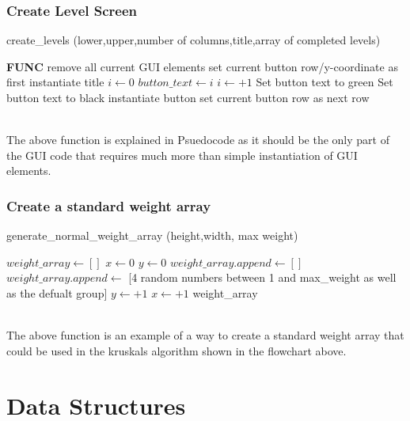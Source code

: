 \documentclass{article}
\begin{document}
\subsubsection{Create Level Screen}
\begin{algorithm}
\caption{create\_levels (lower,upper,number of columns,title,array of completed levels)}
\begin{algorithmic} 
\STATE \textbf{FUNC} remove all current GUI elements
\STATE set current button row/y-coordinate as first
\STATE instantiate title
\STATE $i \leftarrow 0$
\STATE$ button\_text \leftarrow i$
\STATE $i \leftarrow +1$
\STATE Set button text to green
\ELSE
\STATE Set button text to black
\ENDIF
\STATE instantiate button
\STATE set current button row as next row
\ENDIF
\ENDFOR
\end{algorithmic}
\end{algorithm}
\vphantom{0}
\\
The above function is explained in Psuedocode as it should be the only part of the GUI code that requires much more than simple instantiation of GUI elements.  


\subsubsection{Create a standard weight array}
\begin{algorithm}
\caption{generate\_normal\_weight\_array (height,width, max weight)}
\begin{algorithmic} 
\STATE $weight\_array \leftarrow [ ]$
\STATE $x \leftarrow 0$
\STATE $y \leftarrow 0$
\STATE $weight\_array.append \leftarrow [ ]$
\STATE $weight\_array.append \leftarrow$ [4 random numbers between 1 and max\_weight as well as the defualt group]
\STATE $y \leftarrow +1$
\ENDFOR
\STATE $x \leftarrow +1$
\ENDFOR
\RETURN weight\_array
\end{algorithmic}
\end{algorithm}
\vphantom{0}
\\
The above function is an example of a way to create a standard weight array that could be used in the kruskals algorithm shown in the flowchart above.

\clearpage
\section{Data Structures}
\end{document}
